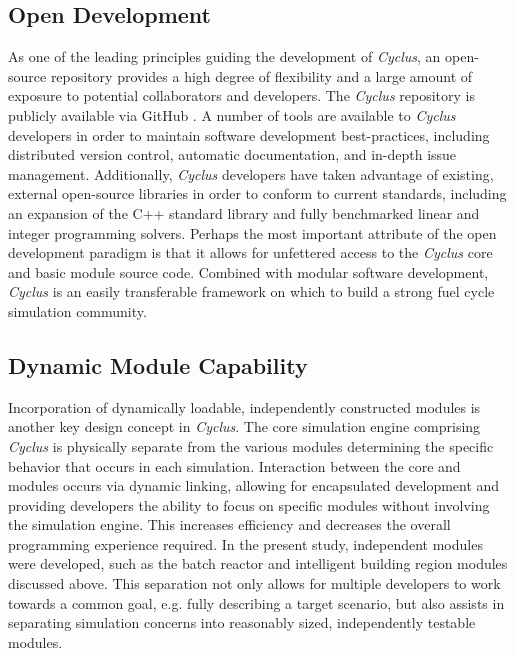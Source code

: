\documentclass{anstrans}
\begin{document}
\subsection{Open Development}
As one of the leading principles guiding the development of
\emph{Cyclus}, an open-source repository provides a high degree of
flexibility and a large amount of exposure to potential collaborators
and developers. The \emph{Cyclus} repository is publicly available via
GitHub \cite{cyclus2012}. A number of tools are available to
\emph{Cyclus} developers in order to maintain software development
best-practices, including distributed version control, automatic
documentation, and in-depth issue management. Additionally,
\emph{Cyclus} developers have taken advantage of existing, external
open-source libraries in order to conform to current standards,
including an expansion of the C++ standard library and fully
benchmarked linear and integer programming solvers. Perhaps the most
important attribute of the open development paradigm is that it allows
for unfettered access to the \emph{Cyclus} core and basic module
source code. Combined with modular software development, \emph{Cyclus}
is an easily transferable framework on which to build a strong fuel
cycle simulation community.
\subsection{Dynamic Module Capability}
Incorporation of dynamically loadable, independently constructed
modules is another key design concept in \emph{Cyclus}. The core
simulation engine comprising \emph{Cyclus} is physically separate from
the various modules determining the specific behavior that occurs in
each simulation.  Interaction between the core and modules occurs via
dynamic linking, allowing for encapsulated development and providing
developers the ability to focus on specific modules without involving
the simulation engine. This increases efficiency and decreases the
overall programming experience required. In the present study,
independent modules were developed, such as the batch reactor and
intelligent building region modules discussed above. This separation
not only allows for multiple developers to work towards a common goal,
e.g. fully describing a target scenario, but also assists in
separating simulation concerns into reasonably sized, independently
testable modules.
\end{document}
